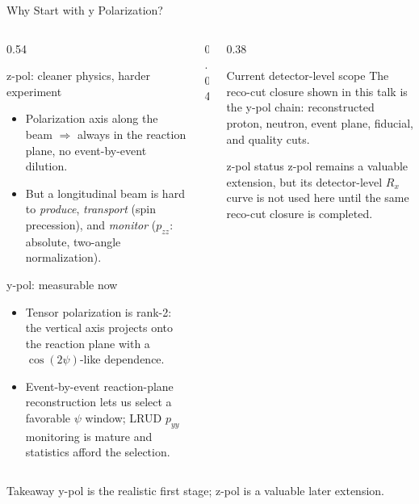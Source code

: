 \documentclass[aspectratio=169]{beamer}
\begin{document}
\begin{frame}{Why Start with y Polarization?}
  \begin{columns}[T,onlytextwidth]
    \begin{column}{0.54\textwidth}
      \begin{block}{z-pol: cleaner physics, harder experiment}
        \scriptsize
        \begin{itemize}
          \item Polarization axis along the beam $\Rightarrow$ always in the
                reaction plane, no event-by-event dilution.
          \item But a longitudinal beam is hard to \emph{produce},
                \emph{transport} (spin precession), and \emph{monitor}
                ($p_{zz}$: absolute, two-angle normalization).
        \end{itemize}
      \end{block}
      \begin{block}{y-pol: measurable now}
        \scriptsize
        \begin{itemize}
          \item Tensor polarization is rank-2: the vertical axis projects onto
                the reaction plane with a $\cos(2\psi)$-like dependence.
          \item Event-by-event reaction-plane reconstruction lets us select a
                favorable $\psi$ window; LRUD $p_{yy}$ monitoring is mature and
                statistics afford the selection.
        \end{itemize}
      \end{block}
    \end{column}
    \begin{column}{0.04\textwidth}
    \end{column}
    \begin{column}{0.38\textwidth}
      \begin{block}{Current detector-level scope}
        \scriptsize
        The reco-cut closure shown in this talk is the y-pol chain:
        reconstructed proton, neutron, event plane, fiducial, and quality cuts.
      \end{block}
      \begin{block}{z-pol status}
        \scriptsize
        z-pol remains a valuable extension, but its detector-level $R_x$ curve
        is not used here until the same reco-cut closure is completed.
      \end{block}
    \end{column}
  \end{columns}
  \vspace{-0.08cm}
  \begin{block}{Takeaway}
    \scriptsize\centering
    y-pol is the realistic first stage; z-pol is a valuable later extension.
  \end{block}
\end{frame}
\end{document}
